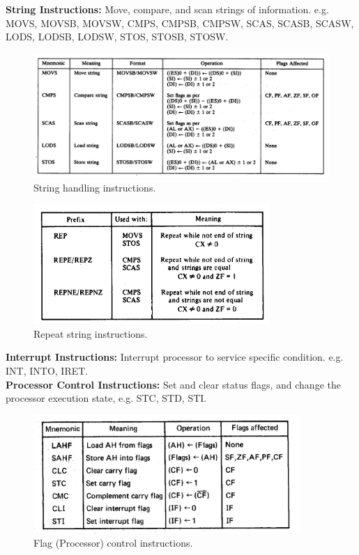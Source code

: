 \documentclass[12pt, a4paper]{scrartcl}
\begin{document}
	\textbf{String Instructions: }Move, compare, and scan strings of information. e.g. MOVS, MOVSB, MOVSW, CMPS, CMPSB, CMPSW, SCAS, SCASB, SCASW, LODS, LODSB, LODSW, STOS, STOSB, STOSW.\\
	\begin{figure}[h]
		\centering
		\includegraphics[width=\textwidth]{images/string.png}
		\caption{String handling instructions.}
		\label{image-13}
	\end{figure}
	\begin{figure}[h]
		\centering
		\includegraphics[width=0.8\textwidth]{images/repeat-string.png}
		\caption{Repeat string instructions.}
		\label{image-14}
	\end{figure}

	\textbf{Interrupt Instructions: }Interrupt processor to service specific condition. e.g. INT, INTO, IRET.\\

	\textbf{Processor Control Instructions: }Set and clear status flags, and change the processor execution state, e.g. STC, STD, STI.\\
	\begin{figure}[h]
		\centering
		\includegraphics[width=0.9\textwidth]{images/flag.png}
		\caption{Flag (Processor) control instructions.}
		\label{image-15}
	\end{figure}
\end{document}
